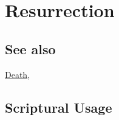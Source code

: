 \section{Resurrection}
	\label{RESURRECTION}
	
\subsection{See also}

	\hyperref[DEATH]{Death},





\subsection{Scriptural Usage} %
	\label{RESURRECTION-SCRIPTURES}

	
	
